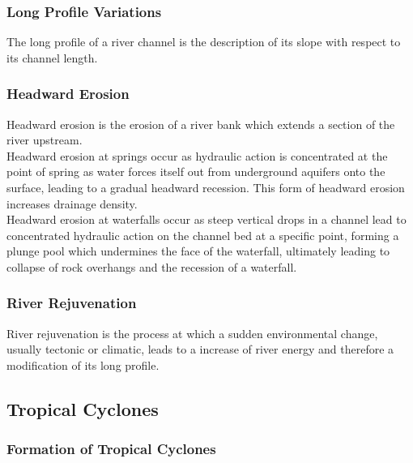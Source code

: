 \documentclass[../../main]{subfiles}
\begin{document}
\subsubsection{Long Profile Variations}

	The long profile of a river channel is the description of its slope with respect to its channel length.

\subsubsection{Headward Erosion}

	Headward erosion is the erosion of a river bank which extends a section of the river upstream. \\

	Headward erosion at springs occur as hydraulic action is concentrated at the point of spring as water forces itself out from underground aquifers onto the surface, leading to a gradual headward recession. This form of headward erosion increases drainage density. \\

	Headward erosion at waterfalls occur as steep vertical drops in a channel lead to concentrated hydraulic action on the channel bed at a specific point, forming a plunge pool which undermines the face of the waterfall, ultimately leading to collapse of rock overhangs and the recession of a waterfall.

\subsubsection{River Rejuvenation}

	River rejuvenation is the process at which a sudden environmental change, usually tectonic or climatic, leads to a increase of river energy and therefore a modification of its long profile.

\subsection{Tropical Cyclones}

	\subsubsection{Formation of Tropical Cyclones}
\end{document}
